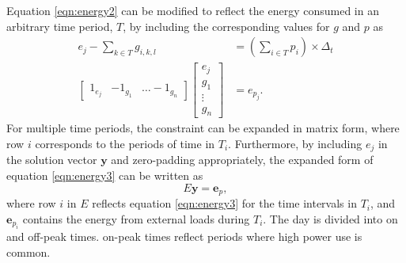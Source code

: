 Equation \ref{eqn:energy2} can be modified to reflect the energy consumed in an arbitrary time period, $T$, by including the corresponding values for $g$ and $p$ as
\begin{equation}\label{eqn:energy3}
	\begin{aligned}
	e_j -\sum_{k\in T}g_{i,k,l} &= \left ( \sum_{i\in T}p_i \right ) \times \Delta_t \\
		\begin{bmatrix} 1_{e_j} & -1_{g_1} & \hdots -1_{g_n} \end{bmatrix} \begin{bmatrix}e_j \\ g_1 \\ \vdots \\ g_n \end{bmatrix} &= e_{p_j}.
	\end{aligned}
\end{equation}
For multiple time periods, the constraint can be expanded in matrix form, where row $i$ corresponds to the periods of time in $T_i$. Furthermore, by including $e_j$ in the solution vector $\mathbf{y}$ and zero-padding appropriately, the expanded form of equation \ref{eqn:energy3} can be written as  
\begin{equation}
	E\mathbf{y} = \mathbf{e}_p,
\end{equation}
where row $i$ in $E$ reflects equation \ref{eqn:energy3} for the time intervals in $T_i$, and $\mathbf{e}_{p_i}$ contains the energy from external loads during $T_i$.
The day is divided into on and off-peak times.  on-peak times reflect periods where high power use is common.
